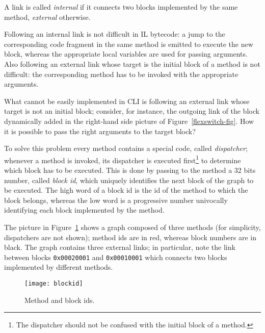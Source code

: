 A link is called \emph{internal} if it connects two blocks implemented
by the same method,
 \emph{external} otherwise.

Following an internal link is not difficult in IL bytecode: a jump to
the corresponding code fragment in the same method is emitted 
to execute the new block, whereas the appropriate local variables are
used for passing arguments.
Also following an external link whose target is the initial block of a
method is not difficult: the corresponding method has to be invoked
with the appropriate arguments.

What cannot be easily implemented in CLI is following an external link
whose target is not an initial block; consider, for instance, the
outgoing link of the block dynamically added in the right-hand side
picture of Figure~\ref{flexswitch-fig}. How it is possible to pass the
right arguments to the target block?

To solve this problem every method contains a special code, called
\emph{dispatcher}; whenever a method is invoked, its dispatcher is
executed first\footnote{The dispatcher should not be
confused with the initial block of a method.} to
determine which block has to be executed.
This is done by passing to the method a 32 bits number, called 
\emph{block id}, which uniquely identifies the next block of the graph to be executed.
The high word of a block id is the id of the method to which the block
belongs, whereas the low word is a progressive number univocally identifying
each block implemented by the method.

The picture in Figure~\ref{block-id-fig} shows a graph composed of three methods (for
simplicity, dispatchers are not shown); method ids are in red, whereas
block numbers are in black. 
The graph contains three external links; in particular, note the link
between blocks \texttt{0x00020001} and \texttt{0x00010001} which
connects two blocks implemented by different methods.
\begin{figure}[h]
\begin{center}
\texttt{[image: blockid]}
\caption{Method and block ids.}\label{block-id-fig}
\end{center}
\end{figure}

